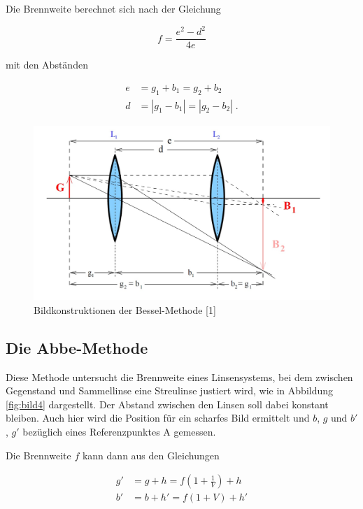 Die Brennweite berechnet sich nach der Gleichung

\begin{equation}
    f = \frac{e^2 - d^2}{4e}
    \label{eqn:bessel}
\end{equation}

mit den Abständen 

\begin{align*}
    e &= g_1 + b_1 = g_2 + b_2 \\
    d &= |g_1 - b_1| = |g_2 - b_2| \; .
\end{align*}

\begin{figure} [H]
    \centering
    \includegraphics[scale=0.3]{content/bild3.png}
    \caption{Bildkonstruktionen der Bessel-Methode [1]}
    \label{fig:bild3}
  \end{figure}

  \subsection{Die Abbe-Methode}

  Diese Methode untersucht die Brennweite eines Linsensystems, bei dem zwischen Gegenstand
  und Sammellinse eine Streulinse justiert wird, wie in Abbildung \ref{fig:bild4}
  dargestellt. Der Abstand zwischen den Linsen soll dabei konstant bleiben.
  Auch hier wird die Position für ein scharfes Bild ermittelt und $b$, $g$ und $b'$, $g'$
  bezüglich eines Referenzpunktes A gemessen. 

  Die Brennweite $f$ kann dann aus den Gleichungen

  \begin{align}
      g' &= g + h = f \left( 1 + \frac{1}{V} \right) + h\label{eqn:abbe1}\\
      b' &= b + h' = f \left( 1 + V \right) + h'
      \label{eqn:abbe}
  \end{align}

